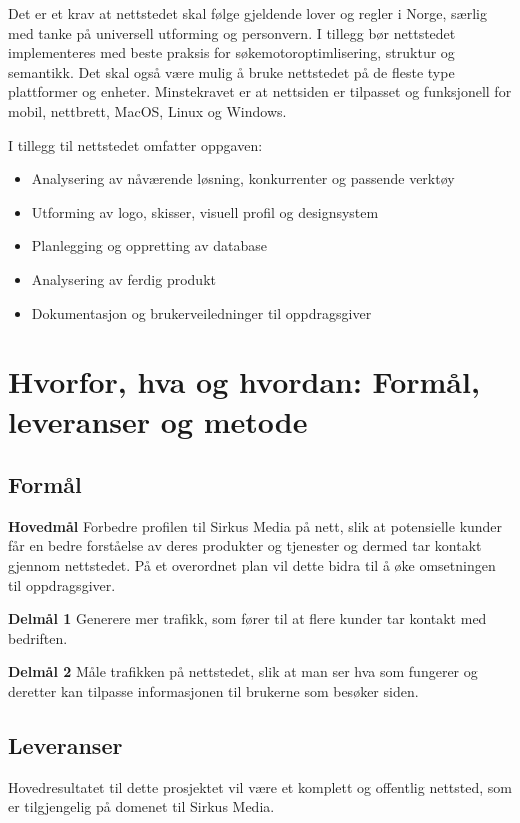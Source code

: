 Det er et krav at nettstedet skal følge gjeldende lover og regler i Norge, særlig med tanke på universell utforming og personvern. I tillegg bør nettstedet implementeres med beste praksis for søkemotoroptimlisering, struktur og semantikk. Det skal også være mulig å bruke nettstedet på de fleste type plattformer og enheter. Minstekravet er at nettsiden er tilpasset og funksjonell for mobil, nettbrett, MacOS, Linux og Windows.

I tillegg til nettstedet omfatter oppgaven: 
\begin{itemize}
\item Analysering av nåværende løsning, konkurrenter og passende verktøy
\item Utforming av logo, skisser, visuell profil og designsystem
\item Planlegging og oppretting av database
\item Analysering av ferdig produkt
\item Dokumentasjon og brukerveiledninger til oppdragsgiver
\end{itemize}

\section{Hvorfor, hva og hvordan: Formål, leveranser og metode}
\label{sec:maal-metode-resultater}
\subsection{Formål}
\label{sec:maal}
\begin{compactitem}
\item [{\bf Hovedmål}] Forbedre profilen til Sirkus Media på nett, slik at potensielle kunder får en bedre forståelse av deres produkter og tjenester og dermed tar kontakt gjennom nettstedet. På et overordnet plan vil dette bidra til å øke omsetningen til oppdragsgiver.
\begin{compactitem}
\item [{\bf  Delmål 1} ] Generere mer trafikk, som fører til at flere kunder tar kontakt med bedriften. 
\item [{\bf  Delmål 2} ] Måle trafikken på nettstedet, slik at man ser hva som fungerer og deretter kan tilpasse informasjonen til brukerne som besøker siden.
\end{compactitem}
\end{compactitem}

\subsection{Leveranser}
\label{sec:resultater}
Hovedresultatet til dette prosjektet vil være et komplett og offentlig nettsted, som er tilgjengelig på domenet til Sirkus Media.

